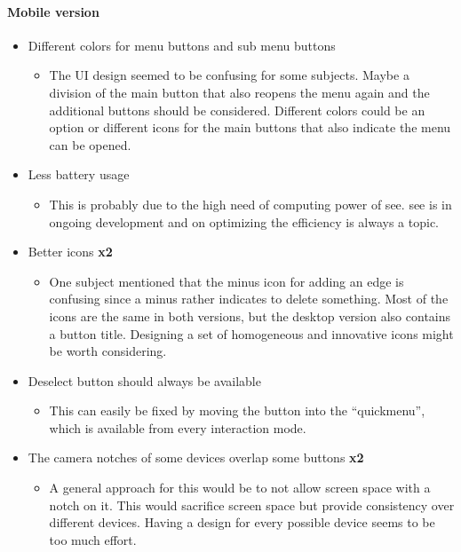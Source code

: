 \paragraph{Mobile version}
\begin{itemize}
  \item Different colors for menu buttons and sub menu buttons 
  \begin{itemize}
    \item The UI design seemed to be confusing for some subjects. 
    Maybe a division of the main button that also reopens the menu again and the additional buttons should be considered. 
    Different colors could be an option or different icons for the main buttons that also indicate the menu can be opened. 
  \end{itemize}
  \item Less battery usage
  \begin{itemize}
    \item This is probably due to the high need of computing power of \gls{see}. \gls{see} is in ongoing development and on optimizing the efficiency is always a topic. 
  \end{itemize}
  \item Better icons \textbf{x2}
  \begin{itemize}
    \item One subject mentioned that the minus icon for adding an edge is confusing since a minus rather indicates to delete something. 
    Most of the icons are the same in both versions, but the desktop version also contains a button title. 
    Designing a set of homogeneous and innovative icons might be worth considering.
  \end{itemize}
  \item Deselect button should always be available 
  \begin{itemize}
    \item This can easily be fixed by moving the button into the \enquote{quickmenu}, which is available from every interaction mode.
  \end{itemize}
  \item The camera notches of some devices overlap some buttons \textbf{x2}
  \begin{itemize}
    \item A general approach for this would be to not allow screen space with a notch on it. 
    This would sacrifice screen space but provide consistency over different devices. 
    Having a design for every possible device seems to be too much effort.

\end{itemize}
\end{itemize}
